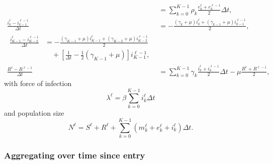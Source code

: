 \documentclass{jpmarticle}
\let\subequationsorig\subequations%
\let\endsubequationsorig\endsubequations%
\renewenvironment{subequations}{
  \subequationsorig
  \renewcommand{\theequation}{\theparentequation.\arabic{equation}}
}{
  \endsubequationsorig
}
\begin{document}
\begin{subequations}
\begin{align}
    &= \sum_{k = 0}^{K - 1} \rho_k
    \frac{e_k^{\ell} + e_k^{\ell - 1}}{2}
    \Delta t,
    \\
    \frac{i_k^{\ell} - i_{k - 1}^{\ell - 1}}{\Delta t} &=
    - \frac{(\gamma_k + \mu) i_k^{\ell}
      + (\gamma_{k - 1} + \mu) i_{k - 1}^{\ell - 1}}{2},
    \\
    \begin{split}
      \frac{i_{K - 1}^{\ell} - i_{K - 2}^{\ell - 1}}{\Delta t} &=
      - \frac{(\gamma_{K - 1} + \mu) i_{K - 1}^{\ell}
        + (\gamma_{K - 2} + \mu) i_{K - 2}^{\ell - 1}}{2}
      \\ & \quad {}
      + \left[
        \frac{1}{\Delta t} - \frac{1}{2} (\gamma_{K - 1} + \mu)
      \right] i_{K - 1}^{\ell - 1},
    \end{split}
    \\
    \frac{R^{\ell} - R^{\ell - 1}}{\Delta t}
    &= \sum_{k = 0}^{K - 1} \gamma_k
    \frac{i_k^{\ell} + i_k^{\ell - 1}}{2}
    \Delta t
    - \mu \frac{R^{\ell} + R^{\ell - 1}}{2},
  \end{align}
  with force of infection
  \begin{equation}
    \lambda^{\ell} =
    \beta \sum_{k = 0}^{K - 1} i_k^{\ell} \Delta t
  \end{equation}
  and population size
  \begin{equation}
    N^{\ell} =
    S^{\ell} + R^{\ell}
    + \sum_{k = 0}^{K - 1} \left(
      m_k^{\ell} + e_k^{\ell} + i_k^{\ell}
    \right) \Delta t.
  \end{equation}
\end{subequations}


\subsubsection{Aggregating over time since entry}
\end{document}
